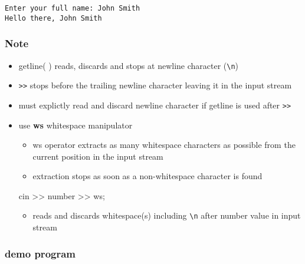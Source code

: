 \documentclass[11pt]{article}
\providecommand{\tightlist}{%
      \setlength{\itemsep}{0pt}\setlength{\parskip}{0pt}}
\newenvironment{Shaded}{}{}
\newcommand{\NormalTok}[1]{{#1}}
\newcommand{\OperatorTok}[1]{\textcolor[rgb]{0.40,0.40,0.40}{{#1}}}
\begin{document}
    \begin{Verbatim}[commandchars=\\\{\}]
Enter your full name: John Smith
Hello there, John Smith
    \end{Verbatim}

    \hypertarget{note}{%
\subsubsection{Note}\label{note}}

\begin{itemize}
\tightlist
\item
  getline( ) reads, discards and stops at newline character
  (\texttt{\textbackslash{}n})
\item
  \texttt{\textgreater{}\textgreater{}} stops before the trailing
  newline character leaving it in the input stream
\item
  must explictly read and discard newline character if getline is used
  after \texttt{\textgreater{}\textgreater{}}
\item
  use \textbf{ws} whitespace manipulator

  \begin{itemize}
  \tightlist
  \item
    ws operator extracts as many whitespace characters as possible from
    the current position in the input stream
  \item
    extraction stops as soon as a non-whitespace character is found
  \end{itemize}

\begin{Shaded}
\begin{Highlighting}[]
\NormalTok{cin }\OperatorTok{\textgreater{}\textgreater{}}\NormalTok{ number }\OperatorTok{\textgreater{}\textgreater{}}\NormalTok{ ws}\OperatorTok{;}
\end{Highlighting}
\end{Shaded}

  \begin{itemize}
  \tightlist
  \item
    reads and discards whitespace(s) including
    \texttt{\textbackslash{}n} after number value in input stream
  \end{itemize}
\end{itemize}

\hypertarget{demo-program}{%
\subsubsection{demo program}\label{demo-program}}
\end{document}
